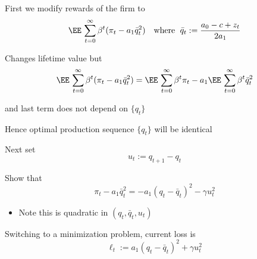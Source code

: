 \begin{frame}

    
    First we modify rewards of the firm to
    \begin{equation*}
        \EE \,
            \sum_{t=0}^{\infty} \beta^t
            (\pi_t  - a_1 \bar q_t^2)
        \quad \text{where } \;
        \bar q_t := \frac{a_0 - c + z_t}{2 a_1}
    \end{equation*}

    Changes lifetime value but 
    \begin{equation*}
        \EE \,
            \sum_{t=0}^{\infty} \beta^t
            (\pi_t  - a_1 \bar q_t^2)
        =
        \EE \, \sum_{t=0}^{\infty} \beta^t \pi_t  
        - a_1 \EE \, \sum_{t=0}^{\infty} \beta^t \bar q_t^2
    \end{equation*}

    and last term does not depend on $\{q_t\}$

        \vspace{0.5em}
        \vspace{0.5em}
    Hence optimal production sequence $\{q_t\}$ will be identical

\end{frame}


\begin{frame}
    
    Next set 
    $$u_t := q_{t+1} - q_t$$


    \Ex Show that 
    \begin{equation*}
        \pi_t  - a_1 \bar q_t^2
        = - a_1 (q_t - \bar q_t)^2 - \gamma u_t^2
    \end{equation*}

        \vspace{0.5em}
    \begin{itemize}
        \item Note this is quadratic in $(q_t, \bar q_t, u_t)$
    \end{itemize}
    
        \vspace{0.5em}
        \vspace{0.5em}
    Switching to a minimization problem, current loss is 
    \begin{equation*}
        \ell_t := a_1 (q_t - \bar q_t)^2 + \gamma u_t^2
    \end{equation*}

\end{frame}

